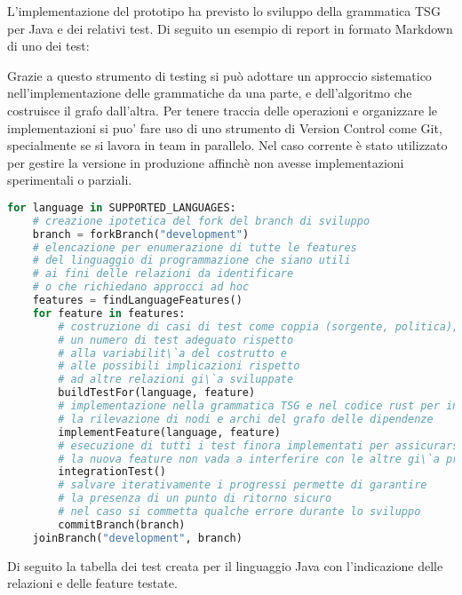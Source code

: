 L'implementazione del prototipo ha previsto lo sviluppo della grammatica TSG per Java e dei relativi test. Di seguito un esempio di report in formato Markdown di uno dei test:


Grazie a questo strumento di testing si pu\`o adottare un approccio sistematico nell'implementazione delle grammatiche da una parte, e dell'algoritmo che costruisce il grafo dall'altra. Per tenere traccia delle operazioni e organizzare le implementazioni si puo' fare uso di uno strumento di Version Control come Git, specialmente se si lavora in team in parallelo. Nel caso corrente \`e stato utilizzato per gestire la versione in produzione affinch\`e non avesse implementazioni sperimentali o parziali.

\begin{lstlisting}[caption="Processo di implementazione", language=Python]
for language in SUPPORTED_LANGUAGES:
    # creazione ipotetica del fork del branch di sviluppo
    branch = forkBranch("development")
    # elencazione per enumerazione di tutte le features
    # del linguaggio di programmazione che siano utili
    # ai fini delle relazioni da identificare
    # o che richiedano approcci ad hoc
    features = findLanguageFeatures()
    for feature in features:
        # costruzione di casi di test come coppia (sorgente, politica);
        # un numero di test adeguato rispetto
        # alla variabilit\`a del costrutto e
        # alle possibili implicazioni rispetto
        # ad altre relazioni gi\`a sviluppate
        buildTestFor(language, feature)
        # implementazione nella grammatica TSG e nel codice rust per introdurre
        # la rilevazione di nodi e archi del grafo delle dipendenze
        implementFeature(language, feature)
        # esecuzione di tutti i test finora implementati per assicurarsi che
        # la nuova feature non vada a interferire con le altre gi\`a presenti
        integrationTest()
        # salvare iterativamente i progressi permette di garantire
        # la presenza di un punto di ritorno sicuro
        # nel caso si commetta qualche errore durante lo sviluppo
        commitBranch(branch)
    joinBranch("development", branch)
\end{lstlisting}

Di seguito la tabella dei test creata per il linguaggio Java con l'indicazione delle relazioni e delle feature testate.

